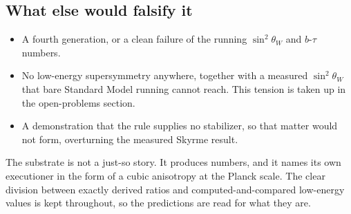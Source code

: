 \subsection{What else would falsify it}

\begin{itemize}
  \item A fourth generation, or a clean failure of the running $\sin^2\theta_W$ and $b$-$\tau$ numbers.
  \item No low-energy supersymmetry anywhere, together with a measured $\sin^2\theta_W$ that bare Standard Model running cannot reach. This tension is taken up in the open-problems section.
  \item A demonstration that the rule supplies no stabilizer, so that matter would not form, overturning the measured Skyrme result.
\end{itemize}


The substrate is not a just-so story. It produces numbers, and it names its own executioner in the form of a cubic anisotropy at the Planck scale. The clear division between exactly derived ratios and computed-and-compared low-energy values is kept throughout, so the predictions are read for what they are.
